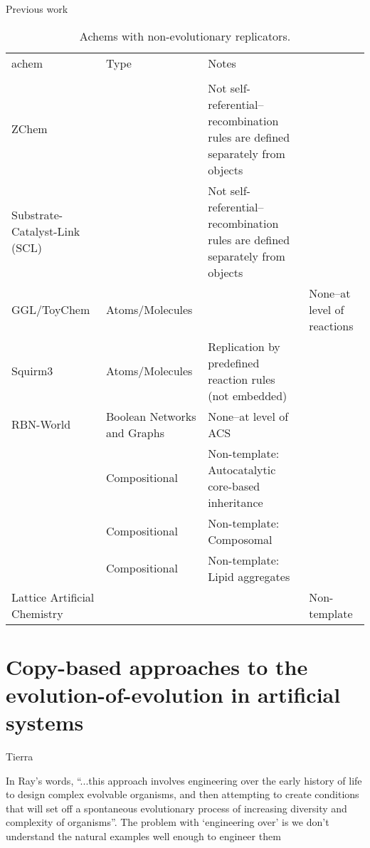 \begin{sidewaystable}
	\begin{center}
		\scriptsize
		\caption{Previous work}
		\label{tb:previous-work}
		\begin{tabular}{@{}llll@{}}
			\hline\noalign{\smallskip}
			\Gls{achem}                                                     & Type 	& Notes\\ 
			\\ \noalign{\smallskip}
			\hline
			\noalign{\smallskip}			
			ZChem \cite{Tominaga2004}                                     	&&Not self-referential--recombination rules are defined separately from objects\\
			Substrate-Catalyst-Link (SCL) \cite{Varela:1974qd,Suzuki2008} 	&&Not self-referential--recombination rules are defined separately from objects\\
			GGL/ToyChem \cite{Benko2003,Benko2005}                        	&Atoms/Molecules&&None--at level of reactions\\			
			Squirm3 \cite{Hutton2002,Hutton2007,Lucht2012}                	&Atoms/Molecules&Replication by predefined reaction rules (not embedded)&\\
			RBN-World \cite{Faulconbridge2011}                            	&Boolean Networks and Graphs& None--at level of ACS\\
			\cite{Vasas2015, Vasas2012, Vasas2012a}							&Compositional&Non-template: Autocatalytic core-based inheritance\\
			\cite{Segre1998}												&Compositional&Non-template: Composomal\\
			\cite{Fernando:2008xy,Fernando:2007pf}                          &Compositional&Non-template: Lipid aggregates\\
			Lattice Artificial Chemistry \cite{Ono2000,Madina2003}        	&&&Non-template\\
			\hline
		\end{tabular}
	\end{center}
	\caption{Achems with non-evolutionary replicators.}
\end{sidewaystable}

\section{Copy-based approaches to the evolution-of-evolution in artificial systems}

Tierra \parencite{Ray1991}

In Ray's words, ``...this approach involves engineering over the early history of life to design complex evolvable organisms, and then attempting to create conditions that will set off a spontaneous evolutionary process of increasing diversity and complexity of organisms''\parencite{Taylor2001}. The problem with `engineering over' is we don't understand the natural examples well enough to engineer them \parencite{Taylor2001}

